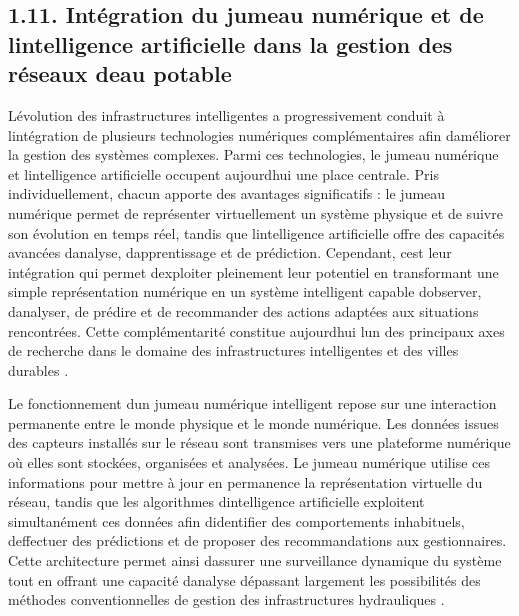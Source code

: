 \documentclass[12pt,a4paper,oneside]{report}
\begin{document}
\subsection{\texorpdfstring{\textbf{1.11. Intégration du jumeau
numérique et de l\textquotesingle intelligence artificielle dans la
gestion des réseaux d\textquotesingle eau
potable}}{1.11. Intégration du jumeau numérique et de l\textquotesingle intelligence artificielle dans la gestion des réseaux d\textquotesingle eau potable}}\label{intuxe9gration-du-jumeau-numuxe9rique-et-de-lintelligence-artificielle-dans-la-gestion-des-ruxe9seaux-deau-potable}

L\textquotesingle évolution des infrastructures intelligentes a
progressivement conduit à l\textquotesingle intégration de plusieurs
technologies numériques complémentaires afin d\textquotesingle améliorer
la gestion des systèmes complexes. Parmi ces technologies, le jumeau
numérique et l\textquotesingle intelligence artificielle occupent
aujourd\textquotesingle hui une place centrale. Pris individuellement,
chacun apporte des avantages significatifs : le jumeau numérique permet
de représenter virtuellement un système physique et de suivre son
évolution en temps réel, tandis que l\textquotesingle intelligence
artificielle offre des capacités avancées d\textquotesingle analyse,
d\textquotesingle apprentissage et de prédiction. Cependant,
c\textquotesingle est leur intégration qui permet
d\textquotesingle exploiter pleinement leur potentiel en transformant
une simple représentation numérique en un système intelligent capable
d\textquotesingle observer, d\textquotesingle analyser, de prédire et de
recommander des actions adaptées aux situations rencontrées. Cette
complémentarité constitue aujourd\textquotesingle hui
l\textquotesingle un des principaux axes de recherche dans le domaine
des infrastructures intelligentes et des villes durables \cite{ref60}.

Le fonctionnement d\textquotesingle un jumeau numérique intelligent
repose sur une interaction permanente entre le monde physique et le
monde numérique. Les données issues des capteurs installés sur le réseau
sont transmises vers une plateforme numérique où elles sont stockées,
organisées et analysées. Le jumeau numérique utilise ces informations
pour mettre à jour en permanence la représentation virtuelle du réseau,
tandis que les algorithmes d\textquotesingle intelligence artificielle
exploitent simultanément ces données afin d\textquotesingle identifier
des comportements inhabituels, d\textquotesingle effectuer des
prédictions et de proposer des recommandations aux gestionnaires. Cette
architecture permet ainsi d\textquotesingle assurer une surveillance
dynamique du système tout en offrant une capacité
d\textquotesingle analyse dépassant largement les possibilités des
méthodes conventionnelles de gestion des infrastructures hydrauliques
\cite{ref37}.
\end{document}
